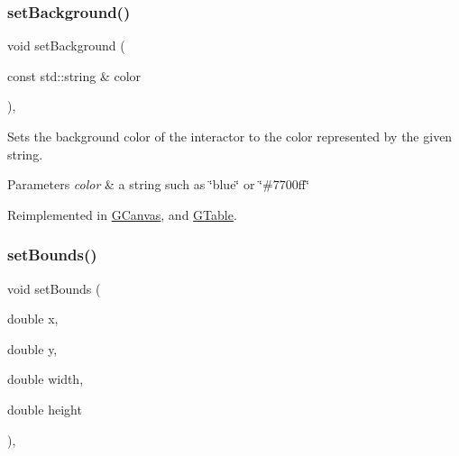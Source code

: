 \mbox{\label{classsgl_1_1GInteractor_ab4677ab2474e68b07aa56605af92a84a}} 
\subsubsection{\texorpdfstring{set\+Background()}{setBackground()}\hspace{0.1cm}{\footnotesize\ttfamily [2/2]}}
{\footnotesize\ttfamily void set\+Background (\begin{DoxyParamCaption}\item[{const std\+::string \&}]{color }\end{DoxyParamCaption})\hspace{0.3cm}{\ttfamily [virtual]}, {\ttfamily [inherited]}}



Sets the background color of the interactor to the color represented by the given string. 


\begin{DoxyParams}{Parameters}
{\em color} & a string such as \char`\"{}blue\char`\"{} or \char`\"{}\#7700ff\char`\"{} \\
\hline
\end{DoxyParams}


Reimplemented in \mbox{\hyperlink{classsgl_1_1GCanvas_a9cb99695b93494c7ba28268ce9e42c2a}{G\+Canvas}}, and \mbox{\hyperlink{classsgl_1_1GTable_a9cb99695b93494c7ba28268ce9e42c2a}{G\+Table}}.

\mbox{\label{classsgl_1_1GInteractor_a2aae8197624b72265ab83b4f1bc73f2f}} 
\subsubsection{\texorpdfstring{set\+Bounds()}{setBounds()}\hspace{0.1cm}{\footnotesize\ttfamily [1/2]}}
{\footnotesize\ttfamily void set\+Bounds (\begin{DoxyParamCaption}\item[{double}]{x,  }\item[{double}]{y,  }\item[{double}]{width,  }\item[{double}]{height }\end{DoxyParamCaption})\hspace{0.3cm}{\ttfamily [virtual]}, {\ttfamily [inherited]}}



